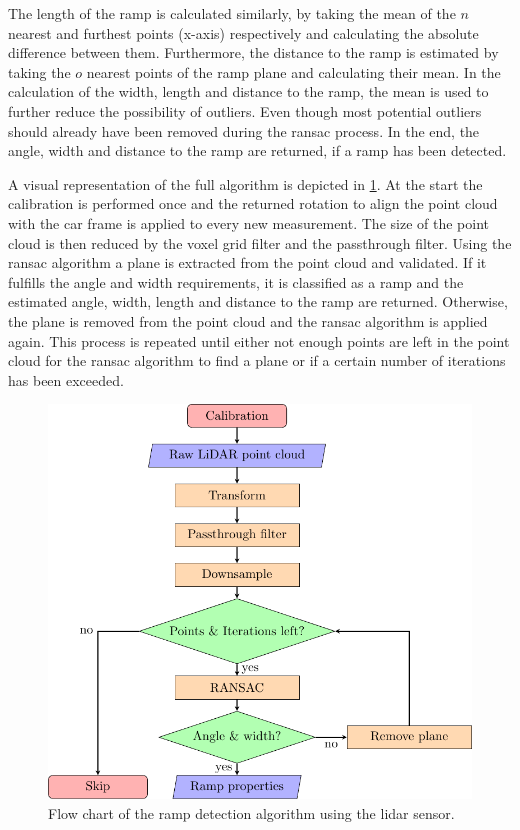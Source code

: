 The length of the ramp is calculated similarly, by taking the mean of the $n$ nearest and furthest points (x-axis) respectively and calculating the absolute difference between them.
Furthermore, the distance to the ramp is estimated by taking the $o$ nearest points of the ramp plane and calculating their mean.
In the calculation of the width, length and distance to the ramp, the mean is used to further reduce the possibility of outliers.
Even though most potential outliers should already have been removed during the \gls{ransac} process.
In the end, the angle, width and distance to the ramp are returned, if a ramp has been detected.\par
A visual representation of the full algorithm is depicted in \cref{fig:flowchart_lidar}.
At the start the calibration is performed once and the returned rotation to align the point cloud with the car frame is applied to every new measurement.
The size of the point cloud is then reduced by the voxel grid filter and the passthrough filter.
Using the \gls{ransac} algorithm a plane is extracted from the point cloud and validated.
If it fulfills the angle and width requirements, it is classified as a ramp and the estimated angle, width, length and distance to the ramp are returned.
Otherwise, the plane is removed from the point cloud and the \gls{ransac} algorithm is applied again.
This process is repeated until either not enough points are left in the point cloud for the \gls{ransac} algorithm to find a plane or if a certain number of iterations has been exceeded.
\begin{figure}[htb]
	\centering
	\includegraphics{Graphics/TikZ/flowchart_lidar.pdf}
	\caption[Flow chart of the  algorithm]{Flow chart of the ramp detection algorithm using the \acrshort{lidar} sensor.}
	\label{fig:flowchart_lidar}
\end{figure}



